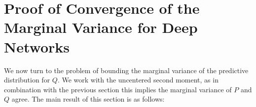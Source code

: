 \documentclass[twoside]{article}
\renewcommand{\ss}[1]{_{\text{#1}}}
\newcommand{\vx}{\mathbf{x}}
\newcommand{\vz}{\mathbf{z}}
\newcommand{\E}{\mathbb{E}}
\renewcommand{\P}{\mathbb{P}}
\newcommand{\Q}{\mathbb{Q}}
\renewcommand{\Q}{\ensuremath{Q}}
\renewcommand{\P}{\ensuremath{P}}
\renewcommand{\ss}[1]{_{\text{#1}}}        %
\DeclarePairedDelimiter\norm{\|}{\|}             %
\DeclarePairedDelimiter\abs{|}{|}                %
\theoremstyle{theoremstyle}
\begin{document}

\section{Proof of Convergence of the Marginal Variance for Deep Networks}\label{app:convergence-of-variance}
 
We now turn to the problem of bounding the marginal variance of the predictive distribution for $\Q$. We work with the uncentered second moment, as in combination with the previous section this implies the marginal variance of $\P$ and $\Q$ agree.
The main result of this section is as follows:
\end{document}
